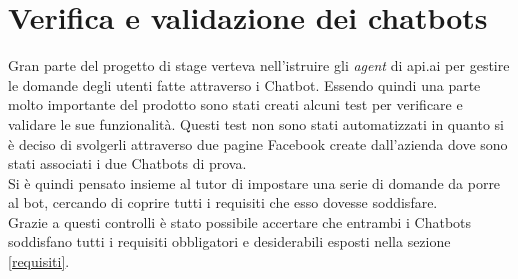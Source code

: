 \section{Verifica e validazione dei chatbots}
Gran parte del progetto di stage verteva nell'istruire gli \emph{agent} di api.ai per gestire le domande degli utenti fatte attraverso i \gls{Chatbot}. Essendo quindi una parte molto importante del prodotto sono stati creati alcuni test per verificare e validare le sue funzionalità. Questi test non sono stati automatizzati in quanto si è deciso di svolgerli attraverso due pagine Facebook create dall'azienda dove sono stati associati i due \glspl{Chatbot} di prova.\\
Si è quindi pensato insieme al tutor di impostare una serie di domande da porre al bot, cercando di coprire tutti i requisiti che esso dovesse soddisfare. \\
Grazie a questi controlli è stato possibile accertare che entrambi i \glspl{Chatbot} soddisfano tutti i requisiti obbligatori e desiderabili esposti nella sezione \ref{requisiti}.

